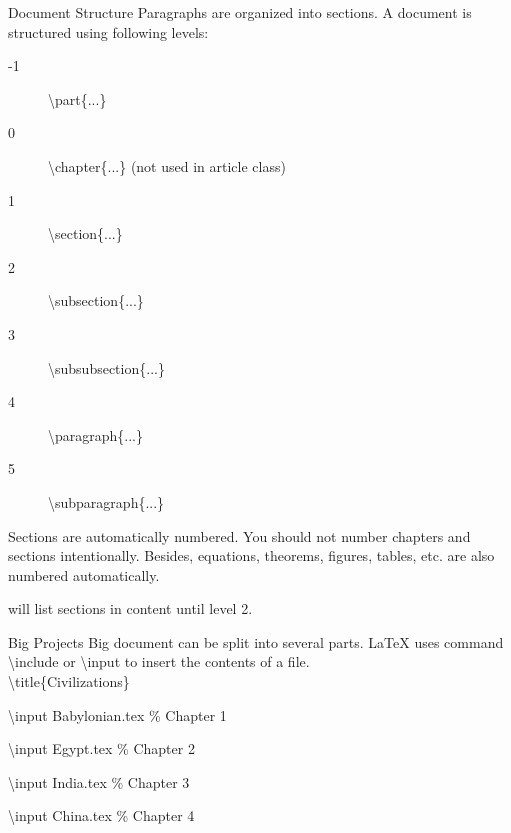 \documentclass[10pt]{beamer}
\begin{document}
\begin{frame}[t]{Document Structure}
Paragraphs are organized into sections.
A document is structured using following levels:
\begin{description}
    \item[-1] \textbackslash part\{...\}
    \item[0] \textbackslash chapter\{...\} (\alert{not used in article class})
    \item[1] \textbackslash section\{...\}
    \item[2] \textbackslash subsection\{...\}
    \item[3] \textbackslash subsubsection\{...\}
    \item[4] \textbackslash paragraph\{...\}
    \item[5] \textbackslash subparagraph\{...\}
\end{description}

Sections are automatically numbered. You should not number chapters
and sections intentionally. Besides, equations, theorems, figures,
tables, etc. are also numbered automatically.


    will list sections in content until level 2.
\end{frame}

\begin{frame}[t]{Big Projects}
    Big document can be split into several parts. \LaTeX{} uses
    command \alert{\textbackslash include} or \alert{\textbackslash input}
    to insert the contents of a file.\\[3ex]

\textbackslash title\{Civilizations\}

\textbackslash input Babylonian.tex \qquad \% Chapter 1

\textbackslash input Egypt.tex \qquad\qquad \% Chapter 2

\textbackslash input India.tex \qquad\qquad \% Chapter 3

\textbackslash input China.tex \qquad\qquad \% Chapter 4


\end{frame}
\end{document}
